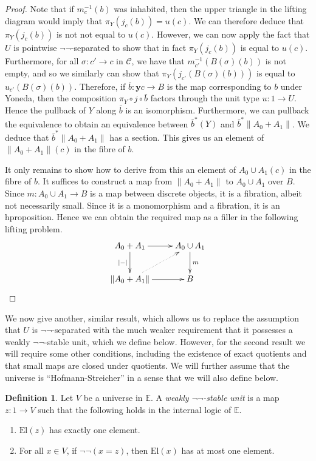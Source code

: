 \documentclass[a4paper]{amsart}
\theoremstyle{definition}
\newtheorem{definition}[theorem]{Definition}
\newcommand{\cat}[1]{\mathbb{#1}}
\newcommand{\smcat}[1]{\mathcal{#1}}
\newcommand{\elv}{\mathrm{El}}
\newcommand{\yoneda}{\mathbf{y}}
\begin{document}
\begin{proof}
  Note that if $m_c^{-1}(b)$ was inhabited, then the upper triangle in
  the lifting diagram would imply that $\pi_Y(j_c(b)) = u(c)$. We can
  therefore deduce that $\pi_Y(j_c(b))$ is not not equal to
  $u(c)$. However, we can now apply the fact that $U$ is pointwise
  $\neg \neg$-separated to show that in fact $\pi_Y(j_c(b))$ is equal
  to $u(c)$. Furthermore, for all $\sigma \colon c' \to c$ in
  $\smcat{C}$, we have that $m_{c'}^{-1}(B(\sigma)(b))$ is not empty,
  and so we similarly can show that $\pi_Y(j_{c'}(B(\sigma)(b)))$ is
  equal to $u_{c'}(B(\sigma)(b))$. Therefore, if
  $\bar{b} \colon \yoneda c \to B$ is the map corresponding to $b$
  under Yoneda, then the composition $\pi_Y \circ j \circ \bar{b}$
  factors through the unit type $u \colon 1 \to U$. Hence the pullback
  of $Y$ along $\bar{b}$ is an isomorphism. Furthermore, we can
  pullback the equivalence to obtain an equivalence between
  $\bar{b}^\ast(Y)$ and $\bar{b}^\ast\| A_0 + A_1 \|$. We deduce that
  $\bar{b}^\ast\| A_0 + A_1 \|$ has a section. This gives us an
  element of $\| A_0 + A_1 \|(c)$ in the fibre of $b$.

  It only remains to show how to derive from this an element of
  $A_0 \cup A_1 (c)$ in the fibre of $b$. It suffices to construct a
  map from $\| A_0 + A_1 \|$ to $A_0 \cup A_1$ over $B$.
  Since
  $m \colon A_0 \cup A_1 \to B$ is a map between discrete objects, it
  is a fibration, albeit not necessarily small. Since it is a
  monomorphism and a fibration, it is an hproposition.
  Hence we can obtain
  the required map as a filler in the following lifting problem.
  \begin{equation*}
    \xymatrix{ A_0 + A_1 \ar[r] \ar[d]_{|-|} & A_0 \cup A_1 \ar[d]^m \\
      \| A_0 + A_1 \| \ar[r] \ar@{.>}[ur] & B}
  \end{equation*}
\end{proof}

We now give another, similar result, which allows us to replace the
assumption that $U$ is $\neg \neg$-separated with the much weaker
requirement that it possesses a weakly $\neg \neg$-stable unit, which
we define below. However, for the second result we will require some
other conditions, including the existence of exact quotients and
that small maps are closed under quotients. We will further assume
that the universe is ``Hofmann-Streicher'' in a sense that we will
also define below.

\begin{definition}
  Let $V$ be a universe in $\cat{E}$. A \emph{weakly $\neg
    \neg$-stable unit} is a map $z \colon 1 \to V$ such that the
  following holds in the internal logic of $\cat{E}$.
  \begin{enumerate}
  \item $\elv(z)$ has exactly one element.
  \item For all $x \in V$, if $\neg \neg (x = z)$, then $\elv(x)$ has at
    most one element.
  \end{enumerate}
\end{definition}
\end{document}
